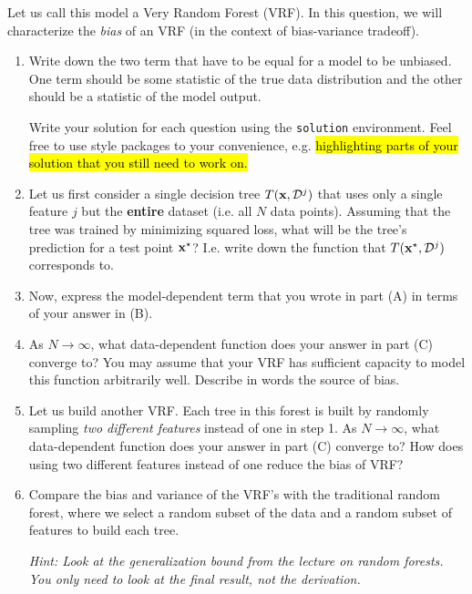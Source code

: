 \documentclass[11pt]{article}
\newenvironment{solution}{\proof[Solution]\color{blue}}{\endproof}
\begin{document}
\noindent Let us call this model a Very Random Forest (VRF). 
In this question, we will characterize the \textit{bias} of an VRF (in the context of bias-variance tradeoff). 

\begin{enumerate}[label=(\Alph*)]

    \item Write down the two term that have to be equal for a model to be unbiased. One term should be some statistic of the true data distribution and the other should be a statistic of the model output.
    
    \begin{solution}
        Write your solution for each question using the \texttt{solution} environment. Feel free to use style packages to your convenience, e.g. \hl{highlighting parts of your solution that you still need to work on.}
    \end{solution}

    \item Let us first consider a single decision tree $T({\mathbf x}, \mathcal{D}^j)$ that uses only a single feature $j$ but the \textbf{entire} dataset (i.e. all $N$ data points). Assuming that the tree was trained by minimizing squared loss, what will be the tree's prediction for a test point ${\mathbf x}^\star$? I.e. write down the function that $T({\mathbf x}^\star, \mathcal{D}^j)$ corresponds to.
    
    
    \item Now, express the model-dependent term that you wrote in part (A) in terms of your answer in (B). 

    
    \item As $N \to \infty$, what data-dependent function does your answer in part (C) converge to? You may assume that your VRF has sufficient capacity to model this function arbitrarily well.
    Describe in words the source of bias.  

    \item Let us build another VRF. Each tree in this forest is built by randomly sampling \textit{two different features} instead of one in step 1. 
    As $N \to \infty$, what data-dependent function does your answer in part (C) converge to? 
    How does using two different features instead of one reduce the bias of VRF?
    
    \item Compare the bias and variance of the VRF's with the traditional random forest, where we select a random subset of the data and a random subset of features to build each tree.
    
    \textit{Hint: Look at the generalization bound from the lecture on random forests. You only need to look at the final result, not the derivation.}


\end{enumerate}
\end{document}

